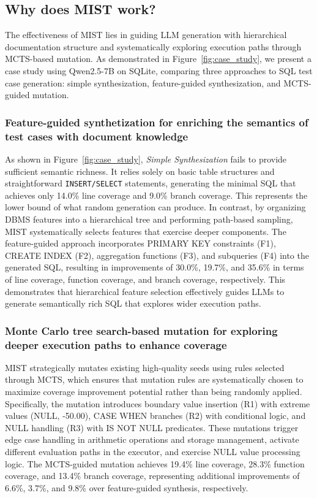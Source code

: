 \label{sec:discuss}


\subsection{Why does MIST work?}

The effectiveness of MIST lies in guiding LLM generation with hierarchical documentation structure and systematically exploring execution paths through MCTS-based mutation. As demonstrated in Figure~\ref{fig:case_study}, we present a case study using Qwen2.5-7B on SQLite, comparing three approaches to SQL test case generation: simple synthesization, feature-guided synthesization, and MCTS-guided mutation.

\subsubsection{Feature-guided synthetization for enriching the semantics of test cases with document knowledge}

As shown in Figure~\ref{fig:case_study}, \textit{Simple Synthesization} fails to provide sufficient semantic richness. It relies solely on basic table structures and straightforward \texttt{INSERT/SELECT} statements, generating the minimal SQL that achieves only 14.0\% line coverage and 9.0\% branch coverage. This represents the lower bound of what random generation can produce. In contrast, by organizing DBMS features into a hierarchical tree and performing path-based sampling, MIST systematically selects features that exercise deeper components. The feature-guided approach incorporates PRIMARY KEY constraints (F1), CREATE INDEX (F2), aggregation functions (F3), and subqueries (F4) into the generated SQL, resulting in improvements of 30.0\%, 19.7\%, and 35.6\% in terms of line coverage, function coverage, and branch coverage, respectively. This demonstrates that hierarchical feature selection effectively guides LLMs to generate semantically rich SQL that explores wider execution paths.

\subsubsection{Monte Carlo tree search-based mutation for exploring deeper execution paths to enhance coverage}

MIST strategically mutates existing high-quality seeds using rules selected through MCTS, which ensures that mutation rules are systematically chosen to maximize coverage improvement potential rather than being randomly applied. Specifically, the mutation introduces boundary value insertion (R1) with extreme values (NULL, -50.00), CASE WHEN branches (R2) with conditional logic, and NULL handling (R3) with IS NOT NULL predicates. These mutations trigger edge case handling in arithmetic operations and storage management, activate different evaluation paths in the executor, and exercise NULL value processing logic. The MCTS-guided mutation achieves 19.4\% line coverage, 28.3\% function coverage, and 13.4\% branch coverage, representing additional improvements of 6.6\%, 3.7\%, and 9.8\% over feature-guided synthesis, respectively.

